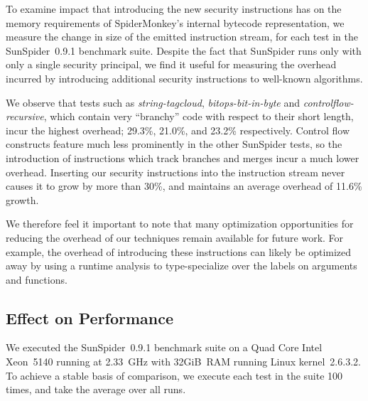 To examine impact that introducing the new security instructions has on the memory requirements of SpiderMonkey's internal bytecode representation, we measure the change in size of the emitted instruction stream, for each test in the SunSpider~0.9.1 benchmark suite.
Despite the fact that SunSpider runs only with only a single security principal, we find it useful for measuring the overhead incurred by introducing additional security instructions to well-known algorithms.

We observe that tests such as \textit{string-tagcloud}, \textit{bitops-bit-in-byte} and \textit{controlflow-recursive}, which contain very ``branchy'' code with respect to their short length, incur the highest overhead; 29.3\%, 21.0\%, and 23.2\% respectively.
Control flow constructs feature much less prominently in the other SunSpider tests, so the introduction of instructions which track branches and merges incur a much lower overhead.
Inserting our security instructions into the instruction stream never causes it to grow by more than 30\%, and maintains an average overhead of 11.6\% growth.

We therefore feel it important to note that many optimization opportunities for reducing the overhead of our techniques remain available for future work.
For example, the overhead of introducing these instructions can likely be optimized away by using a runtime analysis to type-specialize over the labels on arguments and functions.

\subsection{Effect on Performance}
\label{sec:evaluation-performance}

We executed the SunSpider~0.9.1 benchmark suite on a Quad Core Intel Xeon~5140 running at 2.33~GHz with 32GiB~RAM running Linux kernel~2.6.3.2.
To achieve a stable basis of comparison, we execute each test in the suite 100 times, and take the average over all runs.

